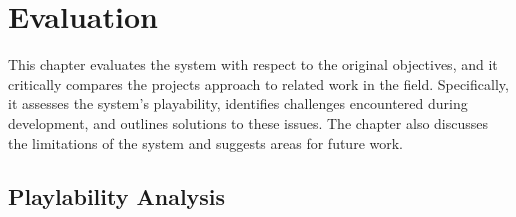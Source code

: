 \chapter{Evaluation}
\label{chapter:evaluation}

This chapter evaluates the system with respect to the original objectives, and it critically compares the projects approach to related work in the field. Specifically, it assesses the system's playability, identifies challenges encountered during development, and outlines solutions to these issues. The chapter also discusses the limitations of the system and suggests areas for future work.

\section{Playlability Analysis}
\label{sec:playability-analysis}






